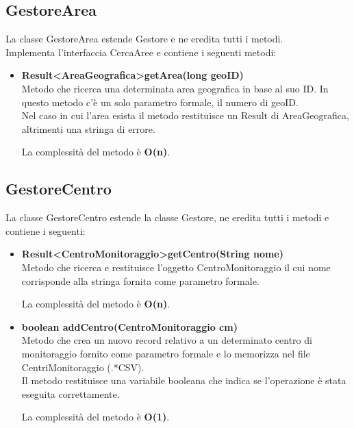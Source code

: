 \documentclass[a4paper, 12pt]{scrreprt}
\begin{document}
			\subsection{GestoreArea}
			La classe GestoreArea estende Gestore e ne eredita tutti i metodi.
			\\ Implementa l'interfaccia CercaAree e contiene i seguenti metodi:
			\begin{itemize}
				\item \textbf{Result\textless AreaGeografica\textgreater getArea(long geoID)}
				\\Metodo che ricerca una determinata area geografica in base al suo ID. In questo metodo c'\`e un solo parametro formale, il numero di geoID.
				\\Nel caso in cui l'area esista il metodo restituisce un Result di AreaGeografica, altrimenti una stringa di errore.
				
				La complessit\`a del metodo \`e \textbf{O(n)}.
			\end{itemize}

			\subsection{GestoreCentro}
			La classe GestoreCentro estende la classe Gestore, ne eredita tutti i metodi e contiene i seguenti:
			\begin{itemize}
				\item \textbf{Result\textless CentroMonitoraggio\textgreater getCentro(String nome)}
				\\Metodo che ricerca e restituisce l'oggetto CentroMonitoraggio il cui nome corrisponde alla stringa fornita come parametro formale.
				
				La complessit\`a del metodo \`e \textbf{O(n)}.
				
				\item \textbf {boolean addCentro(CentroMonitoraggio cm)}
				\\Metodo che crea un nuovo record relativo a un determinato centro di monitoraggio fornito come parametro formale e lo memorizza nel file CentriMonitoraggio (.*CSV).
				\\Il metodo restituisce una variabile booleana che indica se l'operazione \`e stata eseguita correttamente.
				
				La complessit\`a del metodo è \textbf{O(1)}.
			\end{itemize}
\end{document}
